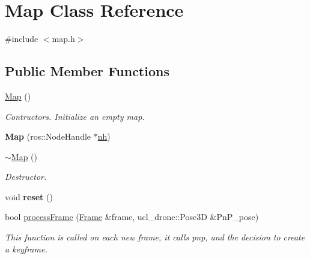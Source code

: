 \hypertarget{classMap}{}\section{Map Class Reference}
\label{classMap}


{\ttfamily \#include $<$map.\+h$>$}

\subsection*{Public Member Functions}
\begin{DoxyCompactItemize}
\item 
\mbox{\label{classMap_a0f5ad0fd4563497b4214038cbca8b582}} 
\hyperlink{classMap_a0f5ad0fd4563497b4214038cbca8b582}{Map} ()
\begin{DoxyCompactList}\small\item\em Contructors. Initialize an empty map. \end{DoxyCompactList}\item 
\mbox{\label{classMap_af1812fd08e41c2afa080a6b2691876d6}} 
{\bfseries Map} (ros\+::\+Node\+Handle $\ast$\hyperlink{classMap_a4bf0c12711369ea6ca8da6d1f1b2ad2f}{nh})
\item 
\mbox{\label{classMap_aa403fbe09394ccf39747588f5168e3b2}} 
\hyperlink{classMap_aa403fbe09394ccf39747588f5168e3b2}{$\sim$\+Map} ()
\begin{DoxyCompactList}\small\item\em Destructor. \end{DoxyCompactList}\item 
\mbox{\label{classMap_a904c445fdce79257fedeba09070cf88a}} 
void {\bfseries reset} ()
\item 
bool \hyperlink{classMap_af98ac6aead03ee4b47a38b57240afd50}{process\+Frame} (\hyperlink{structFrame}{Frame} \&frame, ucl\+\_\+drone\+::\+Pose3D \&Pn\+P\+\_\+pose)
\begin{DoxyCompactList}\small\item\em This function is called on each new frame, it calls pnp, and the decision to create a keyframe. \end{DoxyCompactList}\item 
\mbox{\label{classMap_ab5b44206f7045aa6cd18cfb120d15865}} 

\end{DoxyCompactItemize}
